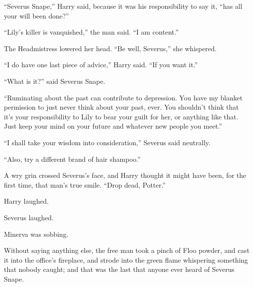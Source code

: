 “Severus Snape,” Harry said, because it was his responsibility to say it, “has all your will been done?”

“Lily’s killer is vanquished,” the man said.
“I am content.”

The Headmistress lowered her head.
“Be well, Severus,” she whispered.

“I do have one last piece of advice,” Harry said.
“If you want it.”

“What is it?” said Severus Snape.

“Ruminating about the past can contribute to depression. You have my blanket permission to just never think about your past, ever. You shouldn’t think that it’s your responsibility to Lily to bear your guilt for her, or anything like that. Just keep your mind on your future and whatever new people you meet.”

“I shall take your wisdom into consideration,” Severus said neutrally.

“Also, try a different brand of hair shampoo.”

A wry grin crossed Severus’s face, and Harry thought it might have been, for the first time, that man’s true smile.
“Drop dead, Potter.”

Harry laughed.

Severus laughed.

Minerva was sobbing.

Without saying anything else, the free man took a pinch of Floo powder, and cast it into the office’s fireplace, and strode into the green flame whispering something that nobody caught; and that was the last that anyone ever heard of Severus Snape.
